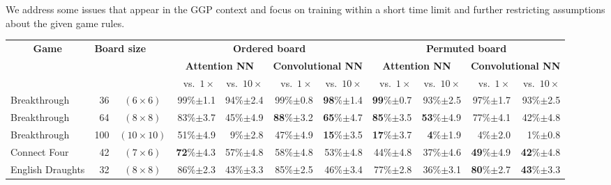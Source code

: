 \documentclass[letterpaper]{article}
\begin{document}
We address some issues that appear in the GGP context and focus on training within a short time limit and further restricting assumptions about the given game rules.


\begin{table*}[!ht]\small\renewcommand{\arraystretch}{1.045}
\newcommand{\cb}[1]{{\scriptsize $\pm$#1}}
\newcommand{\oppA}{vs.\ $1\times$}
\newcommand{\oppB}{vs.\ $10\times$}
\begin{center}\begin{adjustbox}{width=1.69\columnwidth}
\begin{tabular}{|lrc|r|r|r|r|r|r|r|r|}\hline
\multicolumn{1}{|c}{\multirow{3}{*}{{\bf Game}}} & \multicolumn{2}{l|}{\multirow{3}{*}{\bf Board size}} & \multicolumn{4}{c|}{\bf Ordered board} & \multicolumn{4}{c|}{\bf Permuted board} \\\cline{4-11}
& & & \multicolumn{2}{c|}{{\bf Attention NN}} & \multicolumn{2}{c|}{{\bf Convolutional NN}} & \multicolumn{2}{c|}{{\bf Attention NN}} & \multicolumn{2}{c|}{{\bf Convolutional NN}} \\%
\multicolumn{3}{|c|}{} & \oppA & \oppB & \oppA & \oppB & \oppA & \oppB & \oppA & \oppB \\\hline

Breakthrough & 36 & $(6\times6)$  & {99}\%\cb{1.1} & 94\%\cb{2.4} & {99}\%\cb{0.8} & \textbf{98}\%\cb{1.4} & \textbf{99}\%\cb{0.7} & {93}\%\cb{2.5}  & 97\%\cb{1.7} & {93}\%\cb{2.5} \\ %
Breakthrough & 64 & $ (8\times8)$ & 83\%\cb{3.7} & 45\%\cb{4.9} & \textbf{88}\%\cb{3.2} & \textbf{65}\%\cb{4.7} & \textbf{85}\%\cb{3.5} & \textbf{53}\%\cb{4.9} & 77\%\cb{4.1} & 42\%\cb{4.8} \\ %
Breakthrough & 100 & $(10\times10)$ & {51}\%\cb{4.9} & 9\%\cb{2.8} & {47}\%\cb{4.9} & \textbf{15}\%\cb{3.5} & \textbf{17}\%\cb{3.7} & \textbf{4}\%\cb{1.9} & 4\%\cb{2.0} & 1\%\cb{0.8} \\

\multirow{1}{*}{Connect Four} & 42 & $(7\times6)$  & \textbf{72}\%\cb{4.3} & {57}\%\cb{4.8} & 58\%\cb{4.8} & {53}\%\cb{4.8} & 44\%\cb{4.8} & 37\%\cb{4.6}  & \textbf{49}\%\cb{4.9} & \textbf{42}\%\cb{4.8} \\

\multirow{1}{*}{English Draughts} & 32 & $(8\times8)$  & {86}\%\cb{2.3} & {43}\%\cb{3.3} & {85}\%\cb{2.5} & {46}\%\cb{3.4} & 77\%\cb{2.8} & 36\%\cb{3.1}  & \textbf{80}\%\cb{2.7} & \textbf{43}\%\cb{3.3} \\


\end{tabular}
\end{adjustbox}
\end{center}
\end{table*}
\end{document}
